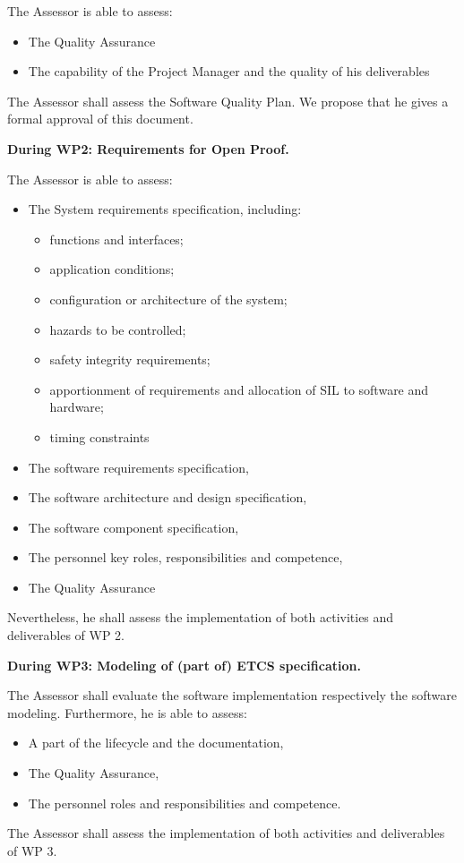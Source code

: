 The Assessor is able to assess:
\begin{itemize}\itemsep=0pt
  \item The Quality Assurance
  \item The capability of the Project Manager and the quality of his deliverables
 \end{itemize}

The Assessor shall assess the Software Quality Plan. We propose that he gives a formal approval of this document.


\textbf{
During WP2: Requirements for Open Proof.
}


The Assessor is able to assess:
\begin{itemize}\itemsep=0pt
  \item The System requirements specification, including:
  \begin{itemize}\itemsep=3pt
    \item functions and interfaces;
    \item application conditions;
    \item configuration or architecture of the system;
    \item hazards to be controlled;
    \item safety integrity requirements;
    \item apportionment of requirements and allocation of SIL to software and hardware;
    \item timing constraints
   \end{itemize}
  \item The software requirements specification,
  \item The software architecture and design specification,
  \item The software component specification,
  \item The personnel key roles, responsibilities and competence,
  \item The Quality Assurance
 \end{itemize}
Nevertheless, he shall assess the implementation of both activities and deliverables of WP 2.


\textbf{
During WP3: Modeling of (part of) ETCS specification.
}

The Assessor shall evaluate the software implementation respectively the software modeling.
Furthermore, he is able to assess:
\begin{itemize}\itemsep=0pt
  \item A part of the lifecycle and the documentation,
  \item The Quality Assurance,
  \item The personnel roles and responsibilities and competence.
 \end{itemize}
The Assessor shall assess the implementation of both activities and deliverables of WP 3.


